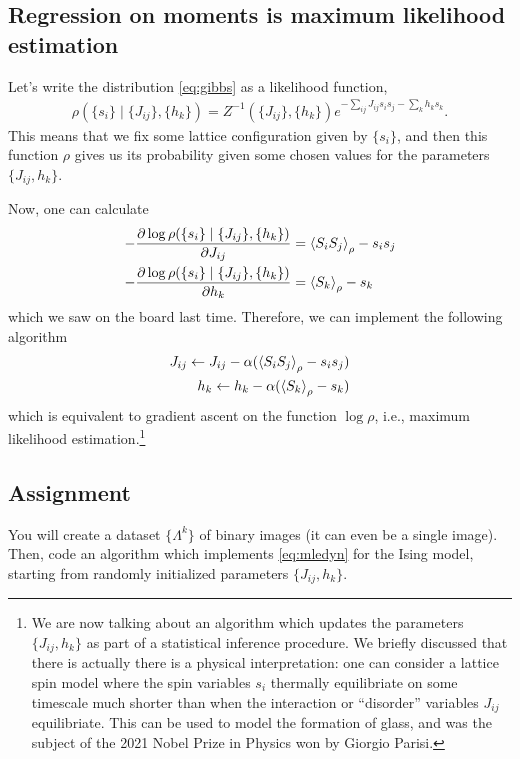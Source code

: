 \documentclass[11pt]{article}
\begin{document}
\subsection{Regression on moments is maximum likelihood estimation}
\label{sec:orgcb847f5}
Let's write the distribution \eqref{eq:gibbs} as a likelihood function,
\begin{align*}
\rho(\{s_{i}\} \mid \{J_{ij}\}, \{h_{k}\}) = Z^{-1}(\{J_{ij}\}, \{h_{k}\})
e^{-\sum_{ij} J_{ij}s_{i}s_{j} -\sum_{k} h_{k}s_{k}}.
\end{align*}
This means that we fix some lattice configuration given by \(\{s_{i}\}\), and
then this function \(\rho\) gives us its probability given some chosen values
for the parameters \(\{J_{ij}, h_{k}\}\).

Now, one can calculate
\begin{align*}
-\pdv{\log \rho(\{s_{i}\} \mid \{J_{ij}\}, \{h_{k}\})}{J_{ij}} &= \ev{S_{i}S_{j}}_{\rho} - s_{i}s_{j} \\
-\pdv{\log \rho(\{s_{i}\} \mid \{J_{ij}\}, \{h_{k}\})}{h_{k}} &= \ev{S_{k}}_{\rho} - s_{k}
\end{align*}
which we saw on the board last time. Therefore, we can implement the following algorithm
\begin{align}
\label{eq:mledyn}
\begin{split}
J_{ij} \leftarrow J_{ij} - \alpha(\ev{S_{i}S_{j}}_{\rho} - s_{i}s_{j}) \\
h_{k} \leftarrow h_{k} - \alpha(\ev{S_{k}}_{\rho} - s_{k})
\end{split}
\end{align}
which is equivalent to gradient ascent on the function \(\log \rho\), i.e.,
maximum likelihood estimation.\footnote{We are now talking about an algorithm which updates the parameters
\(\{J_{ij}, h_{k}\}\) as part of a statistical inference procedure. We briefly
discussed that there is actually there is a physical interpretation: one can
consider a lattice spin model where the spin variables \(s_{i}\) thermally
equilibriate on some timescale much shorter than when the interaction or
``disorder'' variables \(J_{ij}\) equilibriate. This can be used to model the
formation of glass, and was the subject of the 2021 Nobel Prize in Physics won
by Giorgio Parisi.}
\subsection{Assignment}
\label{sec:org9db5d3b}
You will create a dataset \(\{\Lambda^{k}\}\) of binary images (it can even be a
single image). Then, code an algorithm which implements \eqref{eq:mledyn} for
the Ising model, starting from randomly initialized parameters \(\{J_{ij},
h_{k}\}\).
\end{document}
